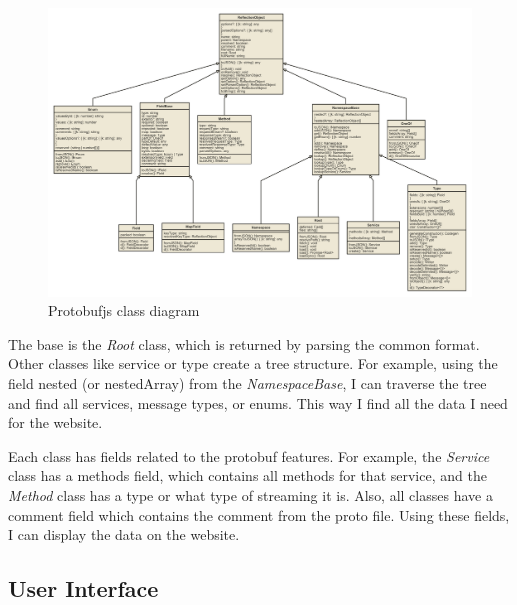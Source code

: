 \begin{landscape}
    \begin{figure}
        \centering
        \captionsetup{justification=centering}
        \includegraphics[width=0.75\paperheight]{images/implementation/protobufjs-class-diagram}
        \caption{Protobufjs class diagram}
        \label{fig:protobufjs-class-diagram}
    \end{figure}
\end{landscape}

The base is the \textit{Root} class, which is returned by parsing the common format.
Other classes like service or type create a tree structure.
For example, using the field nested (or nestedArray) from the \textit{NamespaceBase}, I can traverse the tree and find all services, message types, or enums.
This way I find all the data I need for the website.

Each class has fields related to the protobuf features.
For example, the \textit{Service} class has a methods field, which contains all methods for that service, and the \textit{Method} class has a type or what type of streaming it is.
Also, all classes have a comment field which contains the comment from the proto file.
Using these fields, I can display the data on the website.

\subsection{User Interface}


